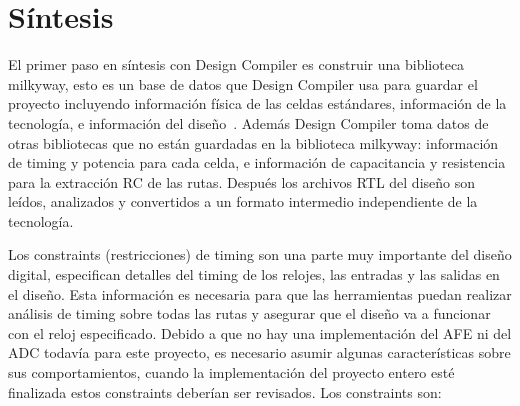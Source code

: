 \documentclass[a4paper, twoside, 11pt]{report}
\begin{document}
\FloatBarrier
\section{Síntesis}

El primer paso en síntesis con Design Compiler es construir una biblioteca milkyway, esto es un base de datos que Design Compiler usa para guardar el proyecto incluyendo información física de las celdas estándares, información de la tecnología, e información del diseño~\cite{milkyway_database_app_note}. Además Design Compiler toma datos de otras bibliotecas que no están guardadas en la biblioteca milkyway: información de timing y potencia para cada celda, e información de capacitancia y resistencia para la extracción RC de las rutas. Después los archivos RTL del diseño son leídos, analizados y convertidos a un formato intermedio independiente de la tecnología.

Los constraints (restricciones) de timing son una parte muy importante del diseño digital, especifican detalles del timing de los relojes, las entradas y las salidas en el diseño. Esta información es necesaria para que las herramientas puedan realizar análisis de timing sobre todas las rutas y asegurar que el diseño va a funcionar con el reloj especificado. Debido a que no hay una implementación del AFE ni del ADC todavía para este proyecto, es necesario asumir algunas características sobre sus comportamientos, cuando la implementación del proyecto entero esté finalizada estos constraints deberían ser revisados. Los constraints son:
\end{document}
